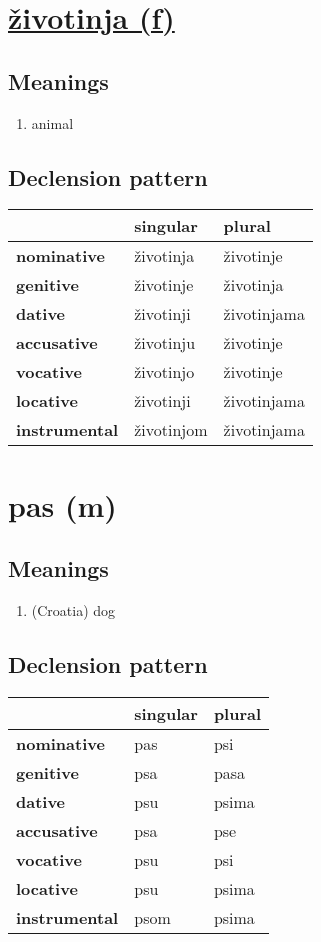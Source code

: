 \section{\underline{životinja (f)}}
\subsection*{Meanings}
\begin{enumerate}
\item animal
\end{enumerate}
\subsection*{Declension pattern}
\begin{tabularx}{\linewidth}{Xll}
\toprule
{} &    singular &       plural \\
\midrule
\textbf{nominative  } &   životinja &    životinje \\
\textbf{genitive    } &   životinje &    životinja \\
\textbf{dative      } &   životinji &  životinjama \\
\textbf{accusative  } &   životinju &    životinje \\
\textbf{vocative    } &   životinjo &    životinje \\
\textbf{locative    } &   životinji &  životinjama \\
\textbf{instrumental} &  životinjom &  životinjama \\
\bottomrule
\end{tabularx}

\filbreak
\section{pas (m)}
\subsection*{Meanings}
\begin{enumerate}
\item (Croatia) dog
\end{enumerate}
\subsection*{Declension pattern}
\begin{tabularx}{\linewidth}{Xll}
\toprule
{} & singular & plural \\
\midrule
\textbf{nominative  } &      pas &    psi \\
\textbf{genitive    } &      psa &   pasa \\
\textbf{dative      } &      psu &  psima \\
\textbf{accusative  } &      psa &    pse \\
\textbf{vocative    } &      psu &    psi \\
\textbf{locative    } &      psu &  psima \\
\textbf{instrumental} &     psom &  psima \\
\bottomrule
\end{tabularx}

